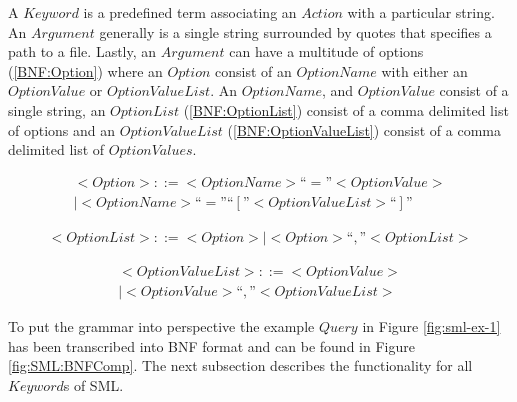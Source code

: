 \documentclass[jair,twoside,11pt,theapa]{article}
\begin{document}
A \(Keyword\) is a predefined term associating an \(Action\) with a particular string. An \(Argument\) generally is a single string surrounded by quotes that specifies a path to a file. Lastly, an \(Argument\) can have a multitude of options (\ref{BNF:Option}) where an \(Option\) consist of an \(OptionName\) with either an \(OptionValue\) or \(OptionValueList\). An \(OptionName\), and \(OptionValue\) consist of a single string, an \(OptionList\) (\ref{BNF:OptionList}) consist of a comma delimited list of options and an \(OptionValueList\) (\ref{BNF:OptionValueList}) consist of a comma delimited list of \(OptionValues\).

\begin{equation} \label{BNF:Option}
\begin{split}
<Option> ::= <Option Name> “=” <Option Value> \\
		| <Option Name> “=” “[”<Option Value List>“]”
\end{split}
\end{equation}

\begin{equation} \label{BNF:OptionList}
\begin{split}
	<Option List> ::= <Option> | <Option> “,” <Option List>
\end{split}
\end{equation}

\begin{equation} \label{BNF:OptionValueList}
\begin{split}
<Option Value List> ::= <Option Value> \\
| <Option Value> “,” <Option Value List>
\end{split}
\end{equation}

To put the grammar into perspective the example \(Query\) in Figure \ref{fig:sml-ex-1} has been transcribed into BNF format and can be found in Figure \ref{fig:SML:BNFComp}. The next subsection describes the functionality for all \(Keyword\)s of SML.
\end{document}
